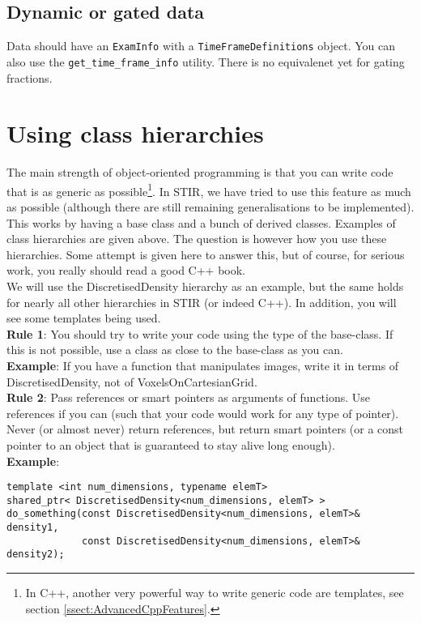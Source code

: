 \documentclass{article}
\begin{document}
\subsection{Dynamic or gated data}
Data should have an \texttt{ExamInfo} with a \texttt{TimeFrameDefinitions} object.
You can also use the \texttt{get\_time\_frame\_info} utility.
There is no equivalenet yet for gating fractions.


\section{
Using class hierarchies \label{sect:classhierarchies}}

The main strength of object-oriented programming is that you 
can write code that is as generic as possible\footnote{In C++, 
another very powerful way to write generic code are templates,
see section \ref{ssect:AdvancedCppFeatures}.}. In STIR, 
we have tried to use this feature as much as possible (although 
there are still remaining generalisations to be implemented). 
This works by having a base class and a bunch of derived classes. 
Examples of class hierarchies are given above. The question is 
however how you use these hierarchies. Some attempt is given 
here to answer this, but of course, for serious work, you really 
should read a good C++ book.\\
We will use the DiscretisedDensity hierarchy as an example, but 
the same holds for nearly all other hierarchies in STIR (or indeed 
C++). In addition, you will see some templates being used.\\
\textbf{Rule 1}: You should try to write your code using the type 
of the base-class. If this is not possible, use a class as close 
to the base-class as you can.\\
\textbf{Example}: If you have a function that manipulates images, 
write it in terms of DiscretisedDensity, not of VoxelsOnCartesianGrid.\\
\textbf{Rule 2}: Pass references or smart pointers as arguments of 
functions. Use references if you can (such that your code would 
work for any type of pointer). Never (or almost never) return 
references, but return smart pointers (or a const pointer to 
an object that is guaranteed to stay alive long enough).\\
\textbf{Example}:

\begin{verbatim}
template <int num_dimensions, typename elemT> 
shared_ptr< DiscretisedDensity<num_dimensions, elemT> >
do_something(const DiscretisedDensity<num_dimensions, elemT>& density1,
             const DiscretisedDensity<num_dimensions, elemT>& density2);
\end{verbatim}
\end{document}
